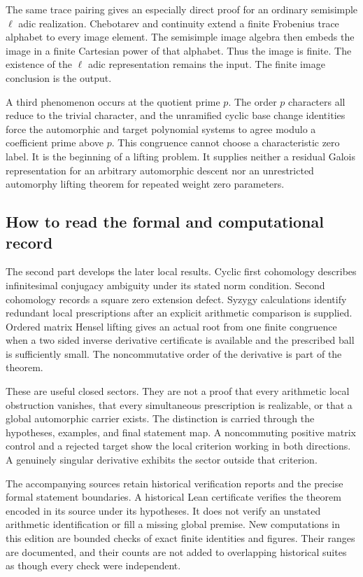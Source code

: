 The same trace pairing gives an especially direct proof for an ordinary semisimple \(\ell\) adic realization. Chebotarev and continuity extend a finite Frobenius trace alphabet to every image element. The semisimple image algebra then embeds the image in a finite Cartesian power of that alphabet. Thus the image is finite. The existence of the \(\ell\) adic representation remains the input. The finite image conclusion is the output.

A third phenomenon occurs at the quotient prime \(p\). The order \(p\) characters all reduce to the trivial character, and the unramified cyclic base change identities force the automorphic and target polynomial systems to agree modulo a coefficient prime above \(p\). This congruence cannot choose a characteristic zero label. It is the beginning of a lifting problem. It supplies neither a residual Galois representation for an arbitrary automorphic descent nor an unrestricted automorphy lifting theorem for repeated weight zero parameters.

\subsection{How to read the formal and computational record}

The second part develops the later local results. Cyclic first cohomology describes infinitesimal conjugacy ambiguity under its stated norm condition. Second cohomology records a square zero extension defect. Syzygy calculations identify redundant local prescriptions after an explicit arithmetic comparison is supplied. Ordered matrix Hensel lifting gives an actual root from one finite congruence when a two sided inverse derivative certificate is available and the prescribed ball is sufficiently small. The noncommutative order of the derivative is part of the theorem.

These are useful closed sectors. They are not a proof that every arithmetic local obstruction vanishes, that every simultaneous prescription is realizable, or that a global automorphic carrier exists. The distinction is carried through the hypotheses, examples, and final statement map. A noncommuting positive matrix control and a rejected target show the local criterion working in both directions. A genuinely singular derivative exhibits the sector outside that criterion.

The accompanying sources retain historical verification reports and the precise formal statement boundaries. A historical Lean certificate verifies the theorem encoded in its source under its hypotheses. It does not verify an unstated arithmetic identification or fill a missing global premise. New computations in this edition are bounded checks of exact finite identities and figures. Their ranges are documented, and their counts are not added to overlapping historical suites as though every check were independent.


